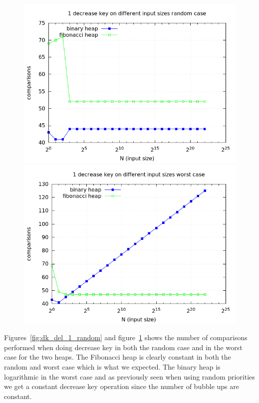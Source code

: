 \documentclass[a4paper,oneside,article,11pt]{memoir}
\begin{document}
\begin{figure}[H]
\centering
\begin{minipage}{0.48\columnwidth}
  \centering
  \includegraphics[width=\linewidth]{../res/dk/dk_random_fixed_size_1.png}%
  \caption{}
  \label{fig:dk_del_1_random}
\end{minipage}%
\hfill
\begin{minipage}{0.48\columnwidth}
  \centering
  \includegraphics[width=\linewidth]{../res/dk/dk_worst_fixed_size_1.png}%
  \caption{}
  \label{fig:dk_del_1_worst}
\end{minipage}
\end{figure}

Figures~\ref{fig:dk_del_1_random} and figure~\ref{fig:dk_del_1_worst} shows the number of comparisons performed when doing decrease key in both the random case and in the worst case for the two heaps. The Fibonacci heap is clearly constant in both the random and worst case which is what we expected. The binary heap is logarithmic in the worst case and as previously seen when using random priorities we get a constant decrease key operation since the number of bubble ups are constant.
\end{document}
